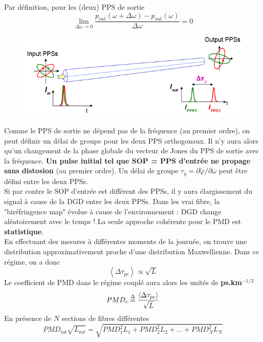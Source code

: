 	Par définition, pour les (deux) PPS de sortie
	\begin{equation}
	\mathop {\lim }\limits_{\Delta \omega  \to 0} \frac{{{p_{out}}(\omega  + \Delta \omega ) -
	 {p_{out}}(\omega )}}{{\Delta \omega }} = 0
	\end{equation}

		\begin{figure}
	\includegraphics[scale=0.4]{ch1/image52}
	\end{figure}
	Comme le PPS de sortie ne dépend pas de la fréquence (au premier ordre), on peut définir un
	délai de groupe pour les deux PPS orthogonaux. Il n'y aura alors qu'un changement de la phase
	globale du vecteur de Jones du PPS de sortie avec la fréquence. \textbf{Un pulse initial 
	tel que SOP = PPS d'entrée ne propage sans distosion} (au premier ordre). Un délai de groupe
	$\tau_g = \partial\tilde{\varphi}/\partial\omega$ peut être défini entre les deux PPSs.	\\
	
	Si par contre le SOP d'entrée est différent des PPSs, il y aura élargissement du signal à cause
	de la DGD entre les deux PPSs. Dans les vrai fibre, la "biréfringence map" évolue à cause de
	l'environnement : DGD change aléatoirement avec le temps ! La seule approche cohérente pour
	le PMD est \textbf{statistique}.\\
	
	En effectuant des mesures à différentes moments de la journée, on trouve une distribution 
	approximativement proche d'une distribution Maxwellienne. Dans ce régime, on a donc
	\begin{equation}
	\left\langle {\Delta {\tau _{pc}}} \right\rangle  \propto \sqrt L 
	\end{equation}
	Le coefficient de PMD dans le régime couplé aura alors les unités de \textbf{ps.km$^{-1/2}$}
	\begin{equation}
	PM{D_c} \buildrel \Delta \over = \frac{{\left\langle {\Delta {\tau _{pc}}} \right\rangle }}{{\sqrt
	 L }}
	\end{equation}
	En présence de $N$ sections de fibres différentes
	\begin{equation}
	PM{D_{tot}}\sqrt {{L_{tot}}}  = \sqrt {PMD_1^2{L_1} + PMD_2^2{L_2} + ... + PMD_N^2{L_N}} 
	\end{equation}\ \\
	
